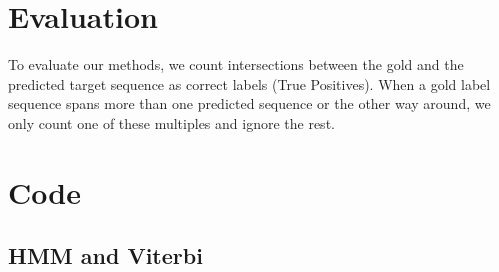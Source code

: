 \documentclass[12pt,pdftex,a4paper]{scrartcl}
\begin{document}
\section{Evaluation}
To evaluate our methods, we count intersections between the gold and the predicted 
target sequence as correct labels (True Positives). When a gold label sequence spans more than one predicted sequence or the other way around, we only count one of these multiples and ignore the rest. 
\appendix
\section{Code}
\subsection{HMM and Viterbi}

\end{document}

